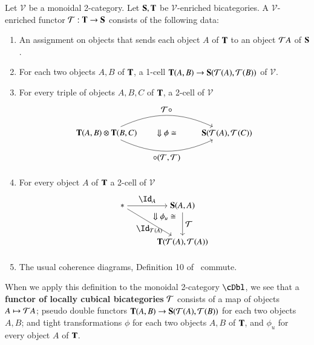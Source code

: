 {\begin{defn}\label{def:lcbcfunc}
Let $\mathcal{V}$ be a monoidal 2-category. Let ${\bf S,T}$ be $\mathcal{V}$-enriched bicategories. A $\mathcal{V}$-enriched functor $\mathcal{T}: {\bf T} \rightarrow {\bf S}$ consists of the following data:
\begin{enumerate}
\item An assignment on objects that sends each object $A$ of ${\bf T}$ to an object $\mathcal{T} A$ of ${\bf S}$.
\item For each two objects $A,B$ of ${\bf T}$, a 1-cell ${\bf T}(A,B) \rightarrow {\bf S}(\mathcal{T}(A),\mathcal{T}(B))$ of $\mathcal{V}$.
\item For every triple of objects $A,B,C$ of ${\bf T}$, a 2-cell of $\mathcal{V}$ 
\begin{align} 
\begin{tikzpicture}
\node(1) at (0,0) {${\bf T}(A,B) \otimes {\bf T}(B,C)$};
\node(2) at (5,0) {${\bf S}(\cT(A),\cT(C))$};
\draw[->] (1) to[in=155, out=25] node[above]{$\cT \comp $} (2); 
\draw[->] (1) to[in=-155, out=-25] node[below]{$ \comp (\cT,\cT)$} (2); 
\node at (2.5,0) {$\Downarrow \phi \iso$};
\end{tikzpicture}
\end{align}
\item For every object $A$ of ${\bf T}$ a 2-cell of $\mathcal{V}$
\begin{align}
\begin{tikzpicture}[xscale=.5, yscale=.3]
\node(1) at (0,0) {$*$};
\node(2) at (5,0) {${\bf S}(A,A)$};
\node(3) at (5,-5) {${\bf T}(\cT(A),\cT(A))$};
\draw[->] (1) to node[above]{$\looseid_{A}$} (2); 
\draw[->] (1) to node[below]{$\looseid_{\cT(A)}$} (3);
\draw[->] (2) to node[right]{$\cT$} (3); 
\node at (3.5,-1.5) {$\Downarrow \phi_u \iso$};
\end{tikzpicture}
\end{align}
\item The usual coherence diagrams, Definition 10 of~\cite{nick:tricatsbook} commute.
\end{enumerate}
\end{defn}

When we apply this definition to the monoidal 2-category $\cDbl$, we see that a {\bf functor of locally cubical bicategories} $\mathcal{T}$ consists of a map of objects $A \mapsto \mathcal{T} A$; pseudo double functors ${\bf T}(A,B) \rightarrow {\bf S}(\mathcal{T}(A),\mathcal{T}(B))$ for each two objects $A,B$; and tight transformations $\phi$ for each two objects $A,B$ of ${\bf T}$, and $\phi_u$ for every object $A$ of ${\bf T}$. 

}
